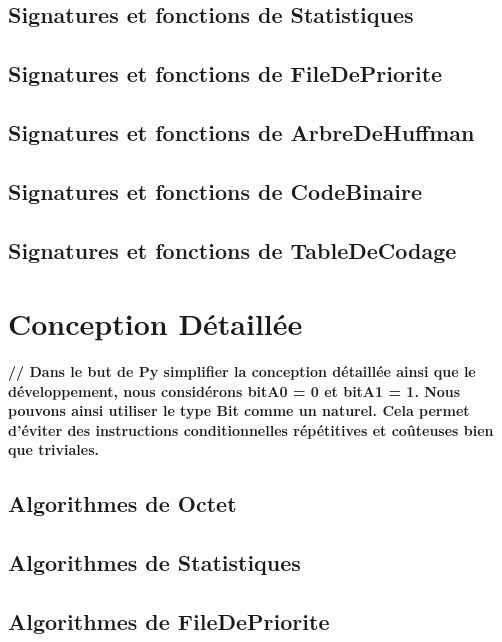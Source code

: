 \documentclass[10pt]{report}
\begin{document}
            \subsection{Signatures et fonctions de Statistiques}
                
            \subsection{Signatures et fonctions de FileDePriorite}
                
            \subsection{Signatures et fonctions de ArbreDeHuffman}
                
            \subsection{Signatures et fonctions de CodeBinaire}
                
            \subsection{Signatures et fonctions de TableDeCodage}
                

        \newpage
        \section{Conception Détaillée}
            \textbf{// Dans le but de Py
simplifier la conception détaillée ainsi que le développement, nous considérons bitA0 = 0 et bitA1 = 1. Nous pouvons ainsi utiliser le type Bit comme un naturel. Cela permet d'éviter des instructions conditionnelles répétitives et coûteuses bien que triviales.}
            \subsection{Algorithmes de Octet}
                
            \subsection{Algorithmes de Statistiques}
                
            \subsection{Algorithmes de FileDePriorite}
                
\end{document}
